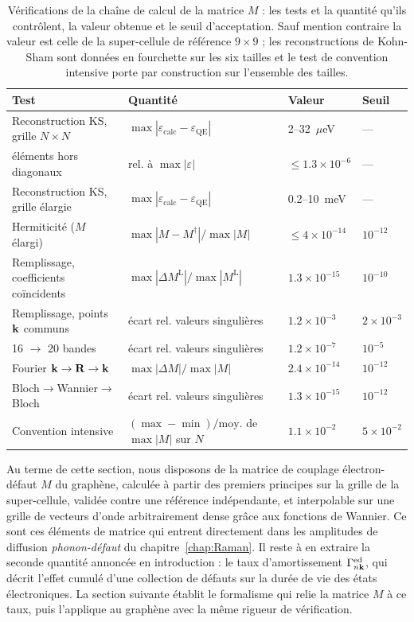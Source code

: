 \begin{table}[htbp]
    \centering
    \small
    \setlength{\tabcolsep}{2pt}
    \caption[Vérifications de la chaîne de calcul de la matrice de
    couplage.]{Vérifications de la chaîne de calcul de la matrice $M$ : les tests et la quantité qu'ils contrôlent, la valeur obtenue et le seuil d'acceptation. Sauf mention contraire la valeur est celle de la super-cellule de référence $9\times9$ ; les reconstructions de Kohn-Sham sont données en fourchette sur les six tailles et le test de convention intensive porte par construction sur l'ensemble des tailles.}
    \label{tab:tests_M}
    \begin{tabular}{l l l l}
        \hline\hline
        Test & Quantité & Valeur & Seuil \\
        \hline
        Reconstruction KS, grille $N\times N$ & $\max|\varepsilon_\text{calc}-\varepsilon_\text{QE}|$ & 2--32~$\mu$eV & --- \\
        \quad éléments hors diagonaux & rel. à $\max|\varepsilon|$ & $\le 1.3\times10^{-6}$ & --- \\
        Reconstruction KS, grille élargie & $\max|\varepsilon_\text{calc}-\varepsilon_\text{QE}|$ & 0.2--10~meV & --- \\
        Hermiticité ($M$ élargi) & $\max|M-M^\dagger|/\max|M|$ & $\le 4\times10^{-14}$ & $10^{-12}$ \\
        Remplissage, coefficients coïncidents & $\max|\Delta M^\text{L}|/\max|M^\text{L}|$ & $1.3\times10^{-15}$ & $10^{-10}$ \\
        Remplissage, points $\mathbf{k}$ communs & écart rel. valeurs singulières & $1.2\times10^{-3}$ & $2\times10^{-3}$ \\
        16 $\to$ 20 bandes & écart rel. valeurs singulières & $1.2\times10^{-7}$ & $10^{-5}$ \\
        Fourier $\mathbf{k}\to\mathbf{R}\to\mathbf{k}$ & $\max|\Delta M|/\max|M|$ & $2.4\times10^{-14}$ & $10^{-12}$ \\
        Bloch$\to$Wannier$\to$Bloch & écart rel. valeurs singulières & $1.3\times10^{-15}$ & $10^{-12}$ \\
        Convention intensive & $(\max-\min)/\text{moy.}$ de $\max|M|$ sur $N$ & $1.1\times10^{-2}$ & $5\times10^{-2}$ \\
        \hline\hline
    \end{tabular}
\end{table}

Au terme de cette section, nous disposons de la matrice de couplage électron-défaut $M$ du graphène, calculée à partir des premiers principes sur la grille de la super-cellule, validée contre une référence indépendante, et interpolable sur une grille de vecteurs d'onde arbitrairement dense grâce aux fonctions de Wannier. Ce sont ces éléments de matrice qui entrent directement dans les amplitudes de diffusion \textit{phonon-défaut} du chapitre~\ref{chap:Raman}. Il reste à en extraire la seconde quantité annoncée en introduction : le taux d'amortissement $\Gamma_{n\mathbf{k}}^\text{ed}$, qui décrit l'effet cumulé d'une collection de défauts sur la durée de vie des états électroniques. La section suivante établit le formalisme qui relie la matrice $M$ à ce taux, puis l'applique au graphène avec la même rigueur de vérification.

